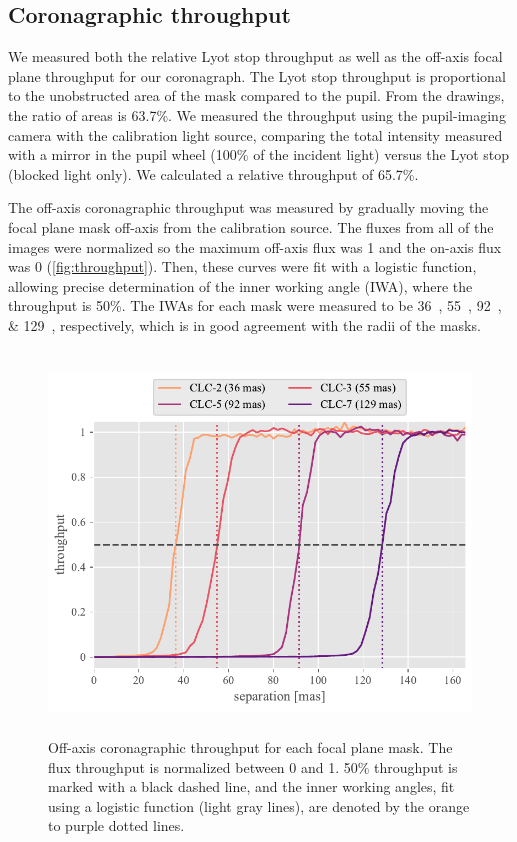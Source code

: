 \documentclass[]{spie}  %
\begin{document}
\subsection{Coronagraphic throughput}

We measured both the relative Lyot stop throughput as well as the off-axis focal plane throughput for our coronagraph. The Lyot stop throughput is proportional to the unobstructed area of the mask compared to the pupil. From the drawings, the ratio of areas is 63.7\%. We measured the throughput using the pupil-imaging camera with the calibration light source, comparing the total intensity measured with a mirror in the pupil wheel (100\% of the incident light) versus the Lyot stop (blocked light only). We calculated a relative throughput of 65.7\%.

The off-axis coronagraphic throughput was measured by gradually moving the focal plane mask off-axis from the calibration source. The fluxes from all of the images were normalized so the maximum off-axis flux was 1 and the on-axis flux was 0 (\autoref{fig:throughput}). Then, these curves were fit with a logistic function, allowing precise determination of the inner working angle (IWA), where the throughput is 50\%. The IWAs for each mask were measured to be \qtylist{36;55;92;129}{\milliarcsecond}, respectively, which is in good agreement with the radii of the masks.


\begin{figure}
   \centering
   \includegraphics[height=4in]{figures/throughput_curves}
   \caption{Off-axis coronagraphic throughput for each focal plane mask. The flux throughput is normalized between 0 and 1. 50\% throughput is marked with a black dashed line, and the inner working angles, fit using a logistic function (light gray lines), are denoted by the orange to purple dotted lines.}\label{fig:throughput}
\end{figure}
\end{document}
